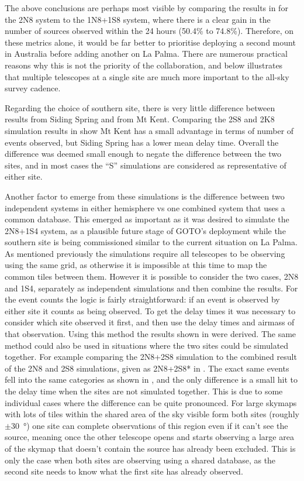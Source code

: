 \begin{colsection}
\begin{colsection}
The above conclusions are perhaps most visible by comparing the results in  for the 2N8 system to the 1N8+1S8 system, where there is a clear gain in the number of sources observed within the 24 hours (50.4\% to 74.8\%). Therefore, on these metrics alone, it would be far better to prioritise deploying a second mount in Australia before adding another on La Palma. There are numerous practical reasons why this is not the priority of the collaboration, and  below illustrates that multiple telescopes at a single site are much more important to the all-sky survey cadence.

Regarding the choice of southern site, there is very little difference between results from Siding Spring and from Mt Kent. Comparing the 2S8 and 2K8 simulation results in  show Mt Kent has a small advantage in terms of number of events observed, but Siding Spring has a lower mean delay time. Overall the difference was deemed small enough to negate the difference between the two sites, and in most cases the ``S'' simulations are considered as representative of either site.

Another factor to emerge from these simulations is the difference between two independent systems in either hemisphere vs one combined system that uses a common database. This emerged as important as it was desired to simulate the 2N8+1S4 system, as a plausible future stage of GOTO's deployment while the southern site is being commissioned similar to the current situation on La Palma. As mentioned previously the simulations require all telescopes to be observing using the same grid, as otherwise it is impossible at this time to map the common tiles between them. However it is possible to consider the two cases, 2N8 and 1S4, separately as independent simulations and then combine the results. For the event counts the logic is fairly straightforward: if an event is observed by either site it counts as being observed. To get the delay times it was necessary to consider which site observed it first, and then use the delay times and airmass of that observation. Using this method the results shown in  were derived. The same method could also be used in situations where the two sites could be simulated together. For example comparing the 2N8+2S8 simulation to the combined result of the 2N8 and 2S8 simulations, given as 2N8+2S8* in . The exact same events fell into the same categories as shown in , and the only difference is a small hit to the delay time when the sites are not simulated together. This is due to some individual cases where the difference can be quite pronounced. For large skymaps with lots of tiles within the shared area of the sky visible form both sites (roughly $\pm$\SI{30}{\degree}) one site can complete observations of this region even if it can't see the source, meaning once the other telescope opens and starts observing a large area of the skymap that doesn't contain the source has already been excluded. This is only the case when both sites are observing using a shared database, as the second site needs to know what the first site has already observed.


\end{colsection}
\end{colsection}
